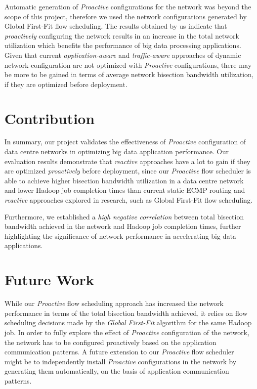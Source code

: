 Automatic generation of \textit{Proactive} configurations for the network was beyond the scope of this project, therefore we used the network configurations generated by Global First-Fit flow scheduling. The results obtained by us indicate that \textit{proactively} configuring the network results in an increase in the total network utilization which benefits the performance of big data processing applications. Given that current \textit{application-aware} and \textit{traffic-aware} approaches of dynamic network configuration are not optimized with \textit{Proactive} configurations, there may be more to be gained in terms of average network bisection bandwidth utilization, if they are optimized before deployment.  

\section{Contribution}
In summary, our project validates the effectiveness of \textit{Proactive} configuration of data centre networks in optimizing big data application performance. Our evaluation results demonstrate that \textit{reactive} approaches have a lot to gain if they are optimized \textit{proactively} before deployment, since our \textit{Proactive} flow scheduler is able to achieve higher bisection bandwidth utilization in a data centre network and lower Hadoop job completion times than current static ECMP routing and \textit{reactive} approaches explored in research, such as Global First-Fit flow scheduling. 

Furthermore, we established a \textit{high negative correlation} between total bisection bandwidth achieved in the network and Hadoop job completion times, further highlighting the significance of network performance in accelerating big data applications.  

\section{Future Work}

While our \textit{Proactive} flow scheduling approach has increased the network performance in terms of the total bisection bandwidth achieved, it relies on flow scheduling decisions made by the \textit{Global First-Fit} algorithm for the same Hadoop job. In order to fully explore the effect of \textit{Proactive} configuration of the network, the network has to be configured proactively based on the application communication patterns. A future extension to our \textit{Proactive} flow scheduler might be to independently install \textit{Proactive} configurations in the network by generating them automatically, on the basis of application communication patterns.

